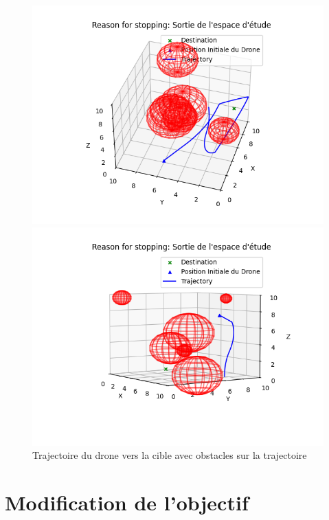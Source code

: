 \documentclass[a4paper, 12pt]{article}
\begin{document}
\begin{figure}[H]
    \centering
    \begin{minipage}{0.49\textwidth}
        \centering
        \includegraphics[width=\textwidth]{Figure_9.png}
    \end{minipage}
    \hfill
    \begin{minipage}{0.49\textwidth}
        \centering
        \includegraphics[width=\textwidth]{Figure_10.png}
    \end{minipage}
    \caption{Trajectoire du drone vers la cible avec obstacles sur la trajectoire}
\end{figure}
\section{Modification de l'objectif}
\end{document}
